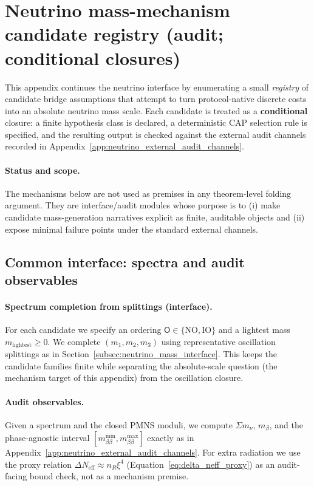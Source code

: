 \section{Neutrino mass-mechanism candidate registry (audit; conditional closures)}
\label{app:neutrino_mass_mechanism_candidates}

This appendix continues the neutrino interface by enumerating a small \emph{registry} of candidate bridge assumptions that attempt to turn protocol-native discrete costs into an absolute neutrino mass scale.
Each candidate is treated as a \textbf{conditional} closure: a finite hypothesis class is declared, a deterministic CAP selection rule is specified, and the resulting output is checked against the external audit channels recorded in Appendix~\ref{app:neutrino_external_audit_channels}.

\paragraph{Status and scope.}
\AuditTag The mechanisms below are not used as premises in any theorem-level folding argument.
They are interface/audit modules whose purpose is to (i) make candidate mass-generation narratives explicit as finite, auditable objects and (ii) expose minimal failure points under the standard external channels.

\subsection{Common interface: spectra and audit observables}
\label{subsec:neutrino_mech_common_interface}

\paragraph{Spectrum completion from splittings (interface).}
For each candidate we specify an ordering $\mathsf{O}\in\{\mathrm{NO},\mathrm{IO}\}$ and a lightest mass $m_{\mathrm{lightest}}\ge 0$.
We complete $(m_1,m_2,m_3)$ using representative oscillation splittings as in Section~\ref{subsec:neutrino_mass_interface}.
This keeps the candidate families finite while separating the absolute-scale question (the mechanism target of this appendix) from the oscillation closure.

\paragraph{Audit observables.}
Given a spectrum and the closed PMNS moduli, we compute $\Sigma m_\nu$, $m_\beta$, and the phase-agnostic interval
$[m_{\beta\beta}^{\min},m_{\beta\beta}^{\max}]$ exactly as in Appendix~\ref{app:neutrino_external_audit_channels}.
For extra radiation we use the proxy relation $\Delta N_\mathrm{eff}\approx n_R\xi^4$ (Equation~\eqref{eq:delta_neff_proxy}) as an audit-facing bound check, not as a mechanism premise.

